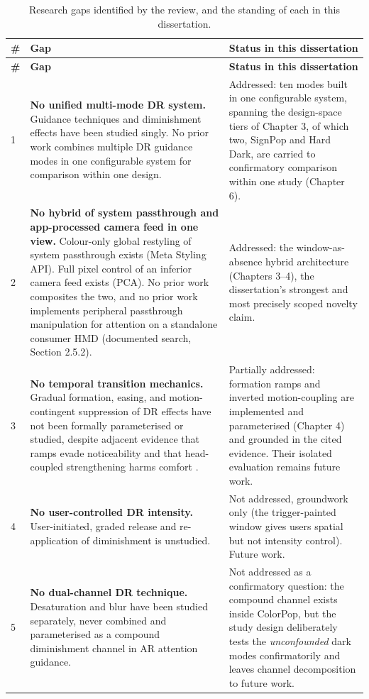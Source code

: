 \begin{longtable}{p{}|p{}|p{}}
\caption{Research gaps identified by the review, and the standing of each in this dissertation.}
\label{tab:gaps} \\
\hline
\textbf{\#} & \textbf{Gap} & \textbf{Status in this dissertation} \\
\hline
\endfirsthead
\hline
\textbf{\#} & \textbf{Gap} & \textbf{Status in this dissertation} \\
\hline
\endhead
1 & \textbf{No unified multi-mode DR system.} Guidance techniques and diminishment effects have been studied singly. No prior work combines multiple DR guidance modes in one configurable system for comparison within one design. & Addressed: ten modes built in one configurable system, spanning the design-space tiers of Chapter 3, of which two, SignPop and Hard Dark, are carried to confirmatory comparison within one study (Chapter 6). \\
\hline
2 & \textbf{No hybrid of system passthrough and app-processed camera feed in one view.} Colour-only global restyling of system passthrough exists (Meta Styling API). Full pixel control of an inferior camera feed exists (PCA). No prior work composites the two, and no prior work implements peripheral passthrough manipulation for attention on a standalone consumer HMD (documented search, Section 2.5.2). & Addressed: the window-as-absence hybrid architecture (Chapters 3–4), the dissertation's strongest and most precisely scoped novelty claim. \\
\hline
3 & \textbf{No temporal transition mechanics.} Gradual formation, easing, and motion-contingent suppression of DR effects have not been formally parameterised or studied, despite adjacent evidence that ramps evade noticeability \citep{hata2016} and that head-coupled strengthening harms comfort \citep{norouzi2018}. & Partially addressed: formation ramps and inverted motion-coupling are implemented and parameterised (Chapter 4) and grounded in the cited evidence. Their isolated evaluation remains future work. \\
\hline
4 & \textbf{No user-controlled DR intensity.} User-initiated, graded release and re-application of diminishment is unstudied. & Not addressed, groundwork only (the trigger-painted window gives users spatial but not intensity control). Future work. \\
\hline
5 & \textbf{No dual-channel DR technique.} Desaturation and blur have been studied separately, never combined and parameterised as a compound diminishment channel in AR attention guidance. & Not addressed as a confirmatory question: the compound channel exists inside ColorPop, but the study design deliberately tests the \textit{unconfounded} dark modes confirmatorily and leaves channel decomposition to future work. \\
\hline
\end{longtable}

